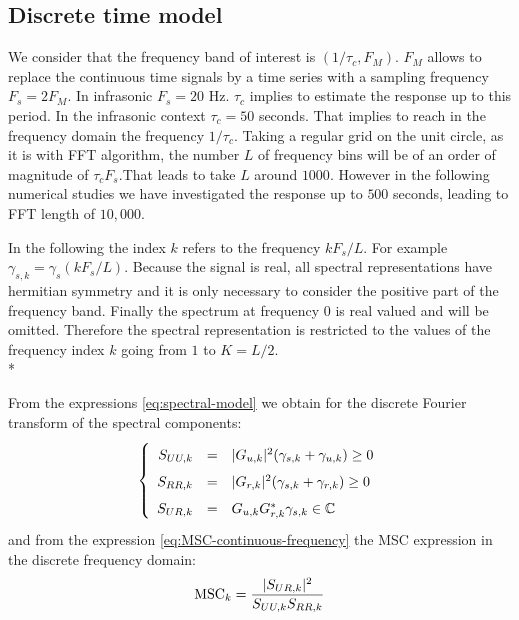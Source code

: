\subsection{Discrete time model}
We consider that the frequency band of interest is $(1/\tau_{c}, F_{M})$. $F_{M}$ allows to replace the continuous time signals by a time series with a sampling frequency $F_{s}=2F_{M}$. In infrasonic $F_{s}=20$ Hz. $\tau_{c}$ implies to estimate the response up to this period. In the infrasonic context $\tau_{c}=50$ seconds. That implies to reach in the  frequency domain the frequency  $1/\tau_{c}$. Taking a regular grid on the unit circle, as it is with FFT algorithm, the number $L$ of frequency bins will be of an order of magnitude of $\tau_{c}F_{s}$.That leads to take $L$ around $1000$. However in the following numerical studies we have investigated the response up to $500$ seconds, leading to FFT length of $10,\!000$.

 In the following the index $k$ refers to the frequency $kF_{s}/L$. For example $\gamma_{s,k}=\gamma_{s}(kF_{s}/L)$. Because the signal is real, all spectral representations have hermitian symmetry and it is only necessary to consider the positive part of the frequency band. Finally the spectrum at frequency 0 is real valued and will be omitted. Therefore the spectral representation is restricted to the values of the frequency index $k$ going from $1$ to $K=L/2$. \\*

From the expressions \eqref{eq:spectral-model} we obtain for the discrete Fourier transform of the spectral components:
\begin{eqnarray}
\label{eq:spectral-model-discrete}
\left\{
\renewcommand\arraystretch{1.6}
\begin{array}{rcl}
S_{UU,k}&=&|G_{\ut,k}|^{2} (\gamma_{s,k}+\gamma_{\ut,k})\geq 0
\\
S_{RR,k}&=&|G_{\rf,k}|^{2} (\gamma_{s,k}+\gamma_{\rf,k})\geq 0
\\
S_{UR,k}&=&G_{\ut,k}G^{*}_{\rf,k}\gamma_{s,k}\in\mathbb{C}
\end{array}
\right.
\end{eqnarray}
and from the expression \eqref{eq:MSC-continuous-frequency} the MSC expression in the discrete frequency domain:
\begin{eqnarray}
 \label{eq:exact-MSC}
\mathrm{MSC}_{k} = \frac{|{S_{UR,k}}|^{2}}{{S_{UU,k}}{S_{RR,k}}}
\end{eqnarray}

